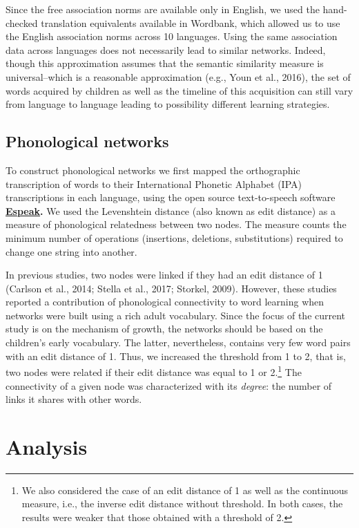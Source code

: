 \documentclass[english,floatsintext,man]{apa6}
\theoremstyle{definition}
\theoremstyle{definition}
\theoremstyle{definition}
\theoremstyle{remark}
\begin{document}
Since the free association norms are available only in English, we used
the hand-checked translation equivalents available in Wordbank, which
allowed us to use the English association norms across 10 languages.
Using the same association data across languages does not necessarily
lead to similar networks. Indeed, though this approximation assumes that
the semantic similarity measure is universal--which is a reasonable
approximation (e.g., Youn et al., 2016), the set of words acquired by
children as well as the timeline of this acquisition can still vary from
language to language leading to possibility different learning
strategies.

\subsection{Phonological networks}\label{phonological-networks}

To construct phonological networks we first mapped the orthographic
transcription of words to their International Phonetic Alphabet (IPA)
transcriptions in each language, using the open source text-to-speech
software \textbf{\href{http://http://espeak.sourceforge.net/}{Espeak}.}
We used the Levenshtein distance (also known as edit distance) as a
measure of phonological relatedness between two nodes. The measure
counts the minimum number of operations (insertions, deletions,
substitutions) required to change one string into another.

In previous studies, two nodes were linked if they had an edit distance
of 1 (Carlson et al., 2014; Stella et al., 2017; Storkel, 2009).
However, these studies reported a contribution of phonological
connectivity to word learning when networks were built using a rich
adult vocabulary. Since the focus of the current study is on the
mechanism of growth, the networks should be based on the children's
early vocabulary. The latter, nevertheless, contains very few word pairs
with an edit distance of 1. Thus, we increased the threshold from 1 to
2, that is, two nodes were related if their edit distance was equal to 1
or
2.\footnote{We also considered the case of an edit distance of 1 as well as the continuous measure, i.e., the inverse edit distance without threshold. In both cases, the results were weaker that those obtained with a threshold of 2.}
The connectivity of a given node was characterized with its
\emph{degree}: the number of links it shares with other words.

\section{Analysis}\label{analysis}
\end{document}
